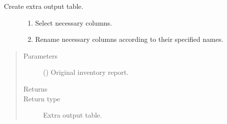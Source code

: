 \documentclass[letterpaper,10pt,english]{sphinxmanual}
\begin{document}
\begin{fulllineitems}
\label{\detokenize{source/optimization.datatools:optimization.datatools.extra_output.extra_output}}
Create extra output table.
\begin{description}
\item[{}] \leavevmode\begin{enumerate}
%
\item {} 
Select necessary columns.

\item {} 
Rename necessary columns according to their specified names.

\end{enumerate}

\end{description}
\begin{quote}\begin{description}
\item[{Parameters}] \leavevmode
{} () \textendash{} Original inventory report.

\item[{Returns}] \leavevmode
{}

\item[{Return type}] \leavevmode
Extra output table.

\end{description}\end{quote}

\end{fulllineitems}

\end{document}
